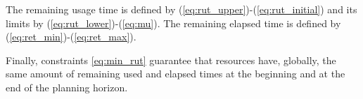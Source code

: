 \documentclass[a4paper,onecolumn,fleqn]{article}
\begin{document}
                

    The remaining usage time is defined by (\ref{eq:rut_upper})-(\ref{eq:rut_initial}) and its limits by (\ref{eq:rut_lower})-(\ref{eq:mu}). 
    The remaining elapsed time is defined by (\ref{eq:ret_min})-(\ref{eq:ret_max}).

    Finally, constraints \ref{eq:min_rut} guarantee that resources have, globally, the same amount of remaining used and elapsed times at the beginning and at the end of the planning horizon.
\end{document}
